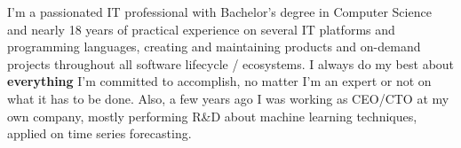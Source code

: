 
\begin{cvparagraph}
I'm a passionated IT professional with Bachelor's degree in Computer Science and nearly 18 years
of practical experience on several IT platforms and programming languages, creating and maintaining
products and on-demand projects throughout all software lifecycle / ecosystems.
I always do my best about \textbf{everything} I'm committed to accomplish, no matter I'm an expert
or not on what it has to be done. Also, a few years ago I was working as CEO/CTO at my own company,
mostly performing R\&D about machine learning techniques, applied on time series forecasting.
\end{cvparagraph}
